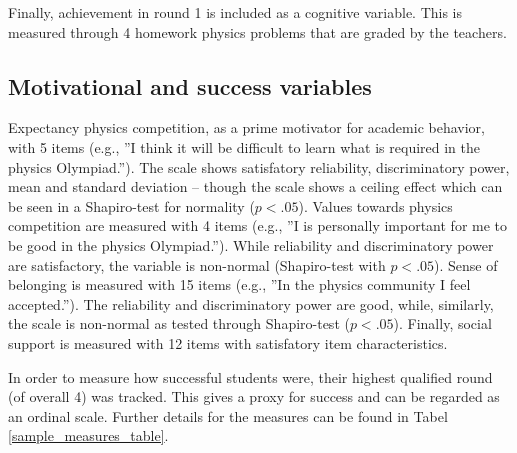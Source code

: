 \documentclass[D:/studies/WinnerS/Erhebungen/IPhO1718/paper/problem_solving/main/TaylorFrancis/interactapasample]{subfiles}
\begin{document}
Finally, achievement in round 1 is included as a cognitive variable. This is measured through 4 homework physics problems that are graded by the teachers. 

\subsection{Motivational and success variables} 

Expectancy physics competition, as a prime motivator for academic behavior, with 5 items (e.g., ''I think it will be difficult to learn what is required in the physics Olympiad.''). The scale shows satisfatory reliability, discriminatory power, mean and standard deviation -- though the scale shows a ceiling effect which can be seen in a Shapiro-test for normality ($p<.05$). Values towards physics competition are measured with 4 items (e.g., ''I is personally important for me to be good in the physics Olympiad.''). While reliability and discriminatory power are satisfactory, the variable is non-normal (Shapiro-test with $p<.05$). Sense of belonging is measured with 15 items (e.g., ''In the physics community I feel accepted.''). The reliability and discriminatory power are good, while, similarly, the scale is non-normal as tested through Shapiro-test ($p<.05$). Finally, social support is measured with 12 items with satisfatory item characteristics.

In order to measure how successful students were, their highest qualified round (of overall 4) was tracked. This gives a proxy for success and can be regarded as an ordinal scale. Further details for the measures can be found in Tabel \ref{sample_measures_table}.

\end{document}
